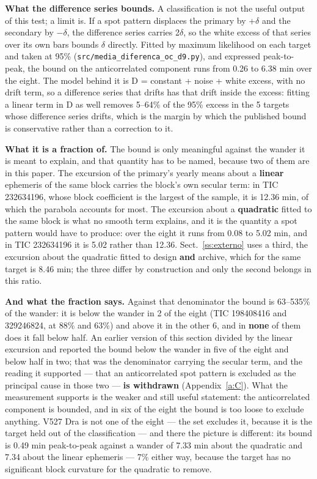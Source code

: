 \documentclass{aa}
\begin{document}
\textbf{What the difference series bounds.} A classification is not the useful output of this test; a limit is. If a spot pattern displaces the primary by +$\delta$ and the secondary by $-\delta$, the difference series carries 2$\delta$, so the white excess of that series over its own bars bounds $\delta$ directly. Fitted by maximum likelihood on each target and taken at 95\% (\texttt{src/\allowbreak media\_\allowbreak diferenca\_\allowbreak oc\_\allowbreak d9.py}), and expressed peak-to-peak, the bound on the anticorrelated component runs from 0.26 to 6.38 min over the eight. The model behind it is D = constant + noise + white excess, with no drift term, so a difference series that drifts has that drift inside the excess: fitting a linear term in D as well removes 5--64\% of the 95\% excess in the 5 targets whose difference series drifts, which is the margin by which the published bound is conservative rather than a correction to it.

\textbf{What it is a fraction of.} The bound is only meaningful against the wander it is meant to explain, and that quantity has to be named, because two of them are in this paper. The excursion of the primary's yearly means about a \textbf{linear} ephemeris of the same block carries the block's own secular term: in TIC 232634196, whose block coefficient is the largest of the sample, it is 12.36 min, of which the parabola accounts for most. The excursion about a \textbf{quadratic} fitted to the same block is what no smooth term explains, and it is the quantity a spot pattern would have to produce: over the eight it runs from 0.08 to 5.02 min, and in TIC 232634196 it is 5.02 rather than 12.36. Sect.~\ref{ss:externo} uses a third, the excursion about the quadratic fitted to design \textbf{and} archive, which for the same target is 8.46 min; the three differ by construction and only the second belongs in this ratio.

\textbf{And what the fraction says.} Against that denominator the bound is 63--535\% of the wander: it is below the wander in 2 of the eight (TIC 198408416 and 329246824, at 88\% and 63\%) and above it in the other 6, and in \textbf{none} of them does it fall below half. An earlier version of this section divided by the linear excursion and reported the bound below the wander in five of the eight and below half in two; that was the denominator carrying the secular term, and the reading it supported --- that an anticorrelated spot pattern is excluded as the principal cause in those two --- \textbf{is withdrawn} (Appendix~\ref{a:C}). What the measurement supports is the weaker and still useful statement: the anticorrelated component is bounded, and in six of the eight the bound is too loose to exclude anything. V527 Dra is not one of the eight --- the set excludes it, because it is the target held out of the classification --- and there the picture is different: its bound is 0.49 min peak-to-peak against a wander of 7.33 min about the quadratic and 7.34 about the linear ephemeris --- 7\% either way, because the target has no significant block curvature for the quadratic to remove.
\end{document}
